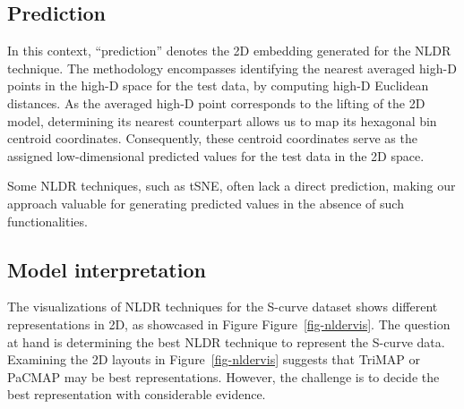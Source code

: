 \documentclass[
  12pt]{article}
\begin{document}
\hypertarget{sec-prediction}{%
\subsection{Prediction}\label{sec-prediction}}

In this context, ``prediction'' denotes the 2D embedding generated for
the NLDR technique. The methodology encompasses identifying the nearest
averaged high-D points in the high-D space for the test data, by
computing high-D Euclidean distances. As the averaged high-D point
corresponds to the lifting of the 2D model, determining its nearest
counterpart allows us to map its hexagonal bin centroid coordinates.
Consequently, these centroid coordinates serve as the assigned
low-dimensional predicted values for the test data in the 2D space.

Some NLDR techniques, such as tSNE, often lack a direct prediction,
making our approach valuable for generating predicted values in the
absence of such functionalities.

\hypertarget{model-interpretation}{%
\subsection{Model interpretation}\label{model-interpretation}}

The visualizations of NLDR techniques for the S-curve dataset shows
different representations in 2D, as showcased in Figure
Figure~\ref{fig-nldervis}. The question at hand is determining the best
NLDR technique to represent the S-curve data. Examining the 2D layouts
in Figure~\ref{fig-nldervis} suggests that TriMAP or PaCMAP may be best
representations. However, the challenge is to decide the best
representation with considerable evidence.
\end{document}

